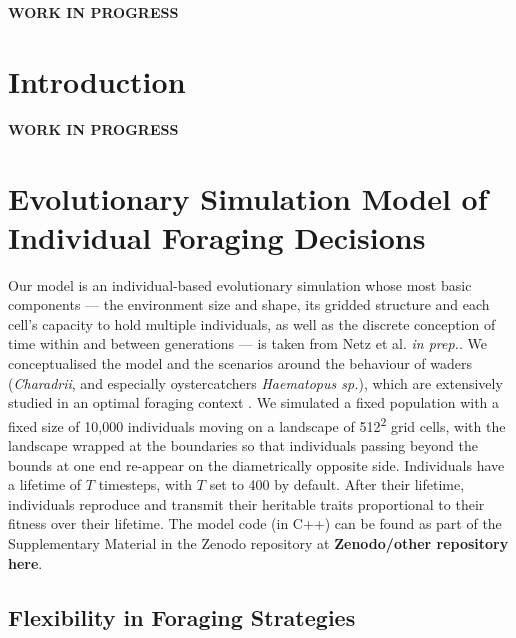 \documentclass[11pt]{article}
\begin{document}
\textbf{WORK IN PROGRESS}

\newpage{}

\section*{Introduction}

\textbf{WORK IN PROGRESS}


\section*{Evolutionary Simulation Model of Individual Foraging Decisions}

Our model is an individual-based evolutionary simulation whose most basic components --- the environment size and shape, its gridded structure and each cell's capacity to hold multiple individuals, as well as the discrete conception of time within and between generations --- is taken from Netz et al. \textit{in prep.}.
We conceptualised the model and the scenarios around the behaviour of waders (\textit{Charadrii}, and especially oystercatchers \textit{Haematopus sp.}), which are extensively studied in an optimal foraging context \citep[e.g. ][]{vahl2005, vahl2005a, vahl2005b, ENS1990219}.
We simulated a fixed population with a fixed size of 10,000 individuals moving on a landscape of 512\textsuperscript{2} grid cells, with the landscape wrapped at the boundaries so that individuals passing beyond the bounds at one end re-appear on the diametrically opposite side.
Individuals have a lifetime of $T$ timesteps, with $T$ set to 400 by default.
After their lifetime, individuals reproduce and transmit their heritable traits proportional to their fitness over their lifetime.
The model code (in C++) can be found as part of the Supplementary Material in the Zenodo repository at \textbf{Zenodo/other repository here}.

\subsection*{Flexibility in Foraging Strategies}
\end{document}
